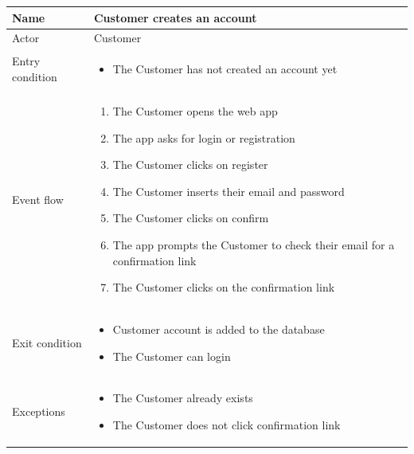 \begin{table}[H]
    \begin{tabu} to \textwidth {|X|X[4]|}
        \hline
        Name            & Customer creates an account \\ \hline
        Actor           & Customer                    \\ \hline
        Entry condition & \begin{itemize}
            \item The Customer has not created an account yet
        \end{itemize}   \\ \hline
        Event flow      & \begin{enumerate}
            \item The Customer opens the web app
            \item The app asks for login or registration
            \item The Customer clicks on register
            \item The Customer inserts their email and password
            \item The Customer clicks on confirm
            \item The app prompts the Customer to check their email for a confirmation link
            \item The Customer clicks on the confirmation link
        \end{enumerate}   \\ \hline
        Exit condition  & \begin{itemize}
            \item Customer account is added to the database
            \item The Customer can login
        \end{itemize}   \\ \hline
        Exceptions      & \begin{itemize}
            \item The Customer already exists
            \item The Customer does not click confirmation link
        \end{itemize}   \\ \hline
    \end{tabu}
\end{table}

